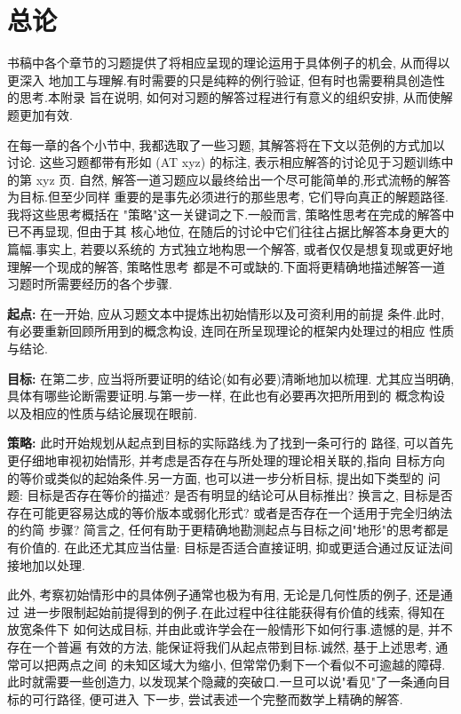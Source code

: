 
\section*{总论}

书稿中各个章节的习题提供了将相应呈现的理论运用于具体例子的机会, 从而得以更深入
地加工与理解.有时需要的只是纯粹的例行验证, 但有时也需要稍具创造性的思考.本附录
旨在说明, 如何对习题的解答过程进行有意义的组织安排, 从而使解题更加有效.

在每一章的各个小节中, 我都选取了一些习题, 其解答将在下文以范例的方式加以讨论.
这些习题都带有形如 (AT xyz) 的标注, 表示相应解答的讨论见于习题训练中的第 xyz 页.
自然, 解答一道习题应以最终给出一个尽可能简单的,形式流畅的解答为目标.但至少同样
重要的是事先必须进行的那些思考, 它们导向真正的解题路径.我将这些思考概括在
"策略"这一关键词之下.一般而言, 策略性思考在完成的解答中已不再显现, 但由于其
核心地位, 在随后的讨论中它们往往占据比解答本身更大的篇幅.事实上, 若要以系统的
方式独立地构思一个解答, 或者仅仅是想复现或更好地理解一个现成的解答, 策略性思考
都是不可或缺的.下面将更精确地描述解答一道习题时所需要经历的各个步骤.

\noindent\textbf{起点:} 在一开始, 应从习题文本中提炼出初始情形以及可资利用的前提
条件.此时, 有必要重新回顾所用到的概念构设, 连同在所呈现理论的框架内处理过的相应
性质与结论.

\noindent\textbf{目标:} 在第二步, 应当将所要证明的结论(如有必要)清晰地加以梳理.
尤其应当明确, 具体有哪些论断需要证明.与第一步一样, 在此也有必要再次把所用到的
概念构设以及相应的性质与结论展现在眼前.

\noindent\textbf{策略:} 此时开始规划从起点到目标的实际路线.为了找到一条可行的
路径, 可以首先更仔细地审视初始情形, 并考虑是否存在与所处理的理论相关联的,指向
目标方向的等价或类似的起始条件.另一方面, 也可以进一步分析目标, 提出如下类型的
问题: 目标是否存在等价的描述? 是否有明显的结论可从目标推出? 换言之, 目标是否
存在可能更容易达成的等价版本或弱化形式? 或者是否存在一个适用于完全归纳法的约简
步骤? 简言之, 任何有助于更精确地勘测起点与目标之间"地形"的思考都是有价值的.
在此还尤其应当估量: 目标是否适合直接证明, 抑或更适合通过反证法间接地加以处理.

此外, 考察初始情形中的具体例子通常也极为有用, 无论是几何性质的例子, 还是通过
进一步限制起始前提得到的例子.在此过程中往往能获得有价值的线索, 得知在放宽条件下
如何达成目标, 并由此或许学会在一般情形下如何行事.遗憾的是, 并不存在一个普遍
有效的方法, 能保证将我们从起点带到目标.诚然, 基于上述思考, 通常可以把两点之间
的未知区域大为缩小, 但常常仍剩下一个看似不可逾越的障碍.此时就需要一些创造力,
以发现某个隐藏的突破口.一旦可以说"看见"了一条通向目标的可行路径, 便可进入
下一步, 尝试表述一个完整而数学上精确的解答.

